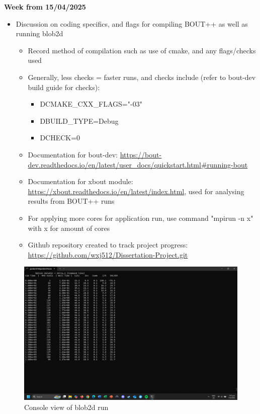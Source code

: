 \documentclass{article}
\begin{document}
\begin{arrowlist}
    \item \textbf{Week from 15/04/2025}
    \begin{itemize}
        \item Discussion on coding specifics, and flags for compiling BOUT++ as well as running blob2d
        \begin{itemize}
            \item Record method of compilation such as use of cmake, and any flags/checks used
            \item Generally, less checks = faster runs, and checks include (refer to bout-dev build guide for checks):
            \begin{itemize}
                \item DCMAKE\_CXX\_FLAGS="-03"
                \item DBUILD\_TYPE=Debug
                \item DCHECK=0
            \end{itemize}
            \item Documentation for bout-dev: \url{https://bout-dev.readthedocs.io/en/latest/user_docs/quickstart.html#running-bout}
            \item Documentation for xbout module: \url{https://xbout.readthedocs.io/en/latest/index.html}, used for analysing results from BOUT++ runs
            \item For applying more cores for application run, use command "mpirun -n x" with x for amount of cores
            \item Github repository created to track project progress: \url{https://github.com/wxj512/Dissertation-Project.git}
        \end{itemize}
    \end{itemize}
    
    \begin{figure}[H]
    \centering
        \includegraphics[height=0.3\textheight]{./Fig/Fig1 blob2d example run.png}
        \normalsize{\caption{Console view of blob2d run}}
        \label{fig:fig1}
    \end{figure}   


\end{arrowlist}
\end{document}
